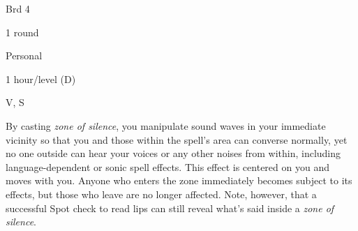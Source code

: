 
\begin{description*}
\item[Level:] Brd 4
\item[Casting Time:] 1 round
\item[Range:] Personal
\item[Duration:] 1 hour/level (D)
\item[Components:] V, S
\end{description*}

By casting \textit{zone of silence}, you manipulate sound waves in your immediate
vicinity so that you and those within the spell's area can converse normally, yet
no one outside can hear your voices or any other noises from within, including
language-dependent or sonic spell effects. This effect is centered on you and moves
with you. Anyone who enters the zone immediately becomes subject to its effects,
but those who leave are no longer affected. Note, however, that a successful Spot
check to read lips can still reveal what's said inside a \textit{zone of silence}.